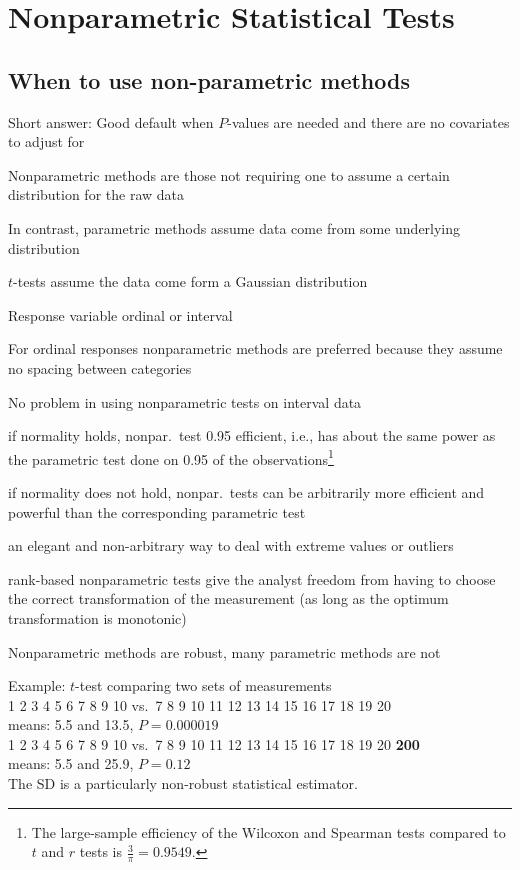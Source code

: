 
%
%

\chapter{Nonparametric Statistical Tests}
\section{When to use non-parametric methods}
\bi
\item Short answer: Good default when $P$-values are needed and there are no covariates to adjust for
\item Nonparametric methods are those not requiring one to assume a
  certain distribution for the raw data
  \bi
  \item In contrast, parametric methods assume data come from some underlying distribution
  \item $t$-tests assume the data come form a Gaussian distribution
  \ei
\item Response variable ordinal or interval
\item For ordinal responses nonparametric methods are preferred
  because they assume no spacing between categories
\item No problem in using nonparametric tests on interval data
 \bi
 \item if normality holds, nonpar.\ test 0.95 efficient, i.e., has
   about the same power as the parametric test done on 0.95 of the
   observations\footnote{The large-sample efficiency of the Wilcoxon
     and Spearman tests compared to $t$ and $r$ tests is
     $\frac{3}{\pi} = 0.9549$.}
 \item if normality does not hold, nonpar.\ tests can be arbitrarily
   more efficient and powerful than the corresponding parametric test 
 \item an elegant and non-arbitrary way to deal with extreme values or
   outliers
 \item rank-based nonparametric tests give the analyst freedom from
   having to choose the correct transformation of the measurement (as
   long as the optimum transformation is monotonic)
 \ei
\item Nonparametric methods are robust, many parametric methods are
  not
 \bi
 \item Example: $t$-test comparing two sets of measurements\\
   1 2 3 4 5 6 7 8 9 10 \hfill vs.\ \hfill 7 8 9 10 11 12 13 14 15 16
   17 18 19 20\\
   means: 5.5 and 13.5, $P=0.000019$\\
   1 2 3 4 5 6 7 8 9 10 \hfill vs.\ \hfill 7 8 9 10 11 12 13 14 15 16
   17 18 19 20 \textbf{200}\\
   means: 5.5 and 25.9, $P=0.12$\\
   The SD is a particularly non-robust statistical estimator.
  \ei


